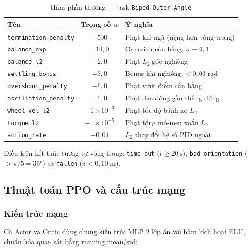 \begin{table}[H]
    \centering
    \caption{Hàm phần thưởng — task \texttt{Biped-Outer-Angle}}
    \label{tab:rewards_outer}
    \renewcommand{\arraystretch}{1.3}
    \begin{tabular}{|l|c|p{7cm}|}
    \hline
    \textbf{Tên} & \textbf{Trọng số $w$} & \textbf{Ý nghĩa} \\
    \hline
    \texttt{termination\_penalty} & $-500$            & Phạt khi ngã (nặng hơn vòng trong) \\
    \texttt{balance\_exp}         & $+10{,}0$         & Gaussian cân bằng, $\sigma=0{,}1$ \\
    \texttt{balance\_l2}          & $-2{,}0$          & Phạt $L_2$ góc nghiêng \\
    \texttt{settling\_bonus}      & $+3{,}0$          & Bonus khi nghiêng $< 0{,}03\;\text{rad}$ \\
    \texttt{overshoot\_penalty}   & $-5{,}0$          & Phạt vượt điểm cân bằng \\
    \texttt{oscillation\_penalty} & $-2{,}0$          & Phạt dao động gần thẳng đứng \\
    \texttt{wheel\_vel\_l2}       & $-1\times10^{-3}$ & Phạt tốc độ bánh xe $L_2$ \\
    \texttt{torque\_l2}           & $-1\times10^{-5}$ & Phạt tổng mô-men xoắn $L_2$ \\
    \texttt{action\_rate}         & $-0{,}01$         & $L_2$ thay đổi hệ số PID ngoài \\
    \hline
    \end{tabular}
\end{table}

Điều kiện kết thúc tương tự vòng trong: \texttt{time\_out} ($t\geq20\;\text{s}$),
\texttt{bad\_orientation} ($> \pi/5 = 36°$) và \texttt{fallen} ($z < 0{,}10\;\text{m}$).


\subsection{Thuật toán PPO và cấu trúc mạng}

\subsubsection{Kiến trúc mạng}

Cả Actor và Critic dùng chung kiến trúc MLP 2 lớp ẩn với hàm kích hoạt
ELU, chuẩn hóa quan sát bằng running mean/std:

